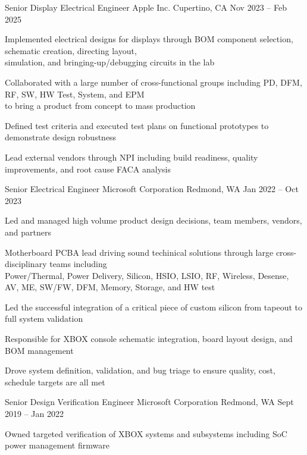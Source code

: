 \documentclass[]{awesome-cv}
\begin{document}
\begin{cventries}
	\cventry
	{Senior Display Electrical Engineer}
	{Apple Inc.}
	{Cupertino, CA}
	{Nov 2023 – Feb 2025}
	{\begin{cvitems}
  \item {Implemented electrical designs for displays through BOM component selection, schematic creation, directing layout, \\
     simulation, and bringing-up/debugging circuits in the lab}
  \item {Collaborated with a large number of cross-functional groups including PD, DFM, RF, SW, HW Test, System, and EPM \\
     to bring a product from concept to mass production}
  \item {Defined test criteria and executed test plans on functional prototypes to demonstrate design robustness}
  \item {Lead external vendors through NPI including build readiness, quality improvements, and root cause FACA analysis}
	\end{cvitems}}
	\cventry
	{Senior Electrical Engineer}
	{Microsoft Corporation}
	{Redmond, WA}
	{Jan 2022 – Oct 2023}
	{\begin{cvitems}
 	\item {Led and managed high volume product design decisions, team members, vendors, and partners}
		\item {Motherboard PCBA lead driving sound techinical solutions through large cross-disciplinary teams including \\ 
  			Power/Thermal, Power Delivery, Silicon, HSIO, LSIO, RF, Wireless, Desense, AV, ME, SW/FW, DFM, Memory, Storage, and HW test}
		\item {Led the successful integration of a critical piece of custom silicon from tapeout to full system validation}
		\item {Responsible for XBOX console schematic integration, board layout design, and BOM management}
		\item {Drove system definition, validation, and bug triage to ensure quality, cost, schedule targets are all met}
	\end{cvitems}}
	\cventry
	{Senior Design Verification Engineer}
	{Microsoft Corporation}
	{Redmond, WA}
	{Sept 2019 – Jan 2022}
	{\begin{cvitems}
		\item {Owned targeted verification of XBOX systems and subsystems including SoC power management firmware}

\end{cvitems}}
\end{cventries}
\end{document}
